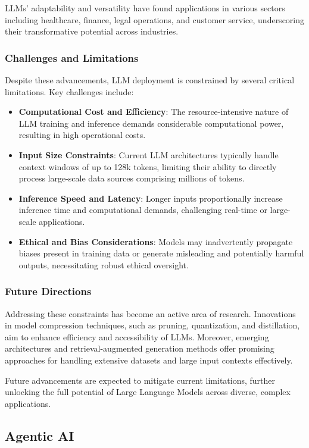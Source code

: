 LLMs’ adaptability and versatility have found applications in various sectors including healthcare, finance, legal operations, and customer service, underscoring their transformative potential across industries.

\subsubsection{Challenges and Limitations}
Despite these advancements, LLM deployment is constrained by several critical limitations. Key challenges include:

\begin{itemize}
    \item \textbf{Computational Cost and Efficiency}: The resource-intensive nature of LLM training and inference demands considerable computational power, resulting in high operational costs.
    \item \textbf{Input Size Constraints}: Current LLM architectures typically handle context windows of up to 128k tokens, limiting their ability to directly process large-scale data sources comprising millions of tokens.
    \item \textbf{Inference Speed and Latency}: Longer inputs proportionally increase inference time and computational demands, challenging real-time or large-scale applications.
    \item \textbf{Ethical and Bias Considerations}: Models may inadvertently propagate biases present in training data or generate misleading and potentially harmful outputs, necessitating robust ethical oversight.
\end{itemize}

\subsubsection{Future Directions}
Addressing these constraints has become an active area of research. Innovations in model compression techniques, such as pruning, quantization, and distillation, aim to enhance efficiency and accessibility of LLMs. Moreover, emerging architectures and retrieval-augmented generation methods offer promising approaches for handling extensive datasets and large input contexts effectively.

Future advancements are expected to mitigate current limitations, further unlocking the full potential of Large Language Models across diverse, complex applications.

\subsection{Agentic AI}


